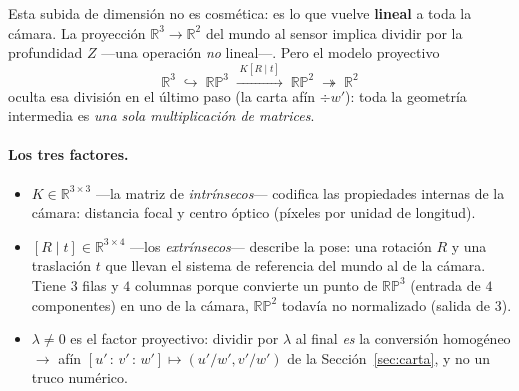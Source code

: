 \documentclass[11pt,a4paper]{article}
\newcommand{\RP}{\mathbb{RP}}
\newcommand{\R}{\mathbb{R}}
\newcommand{\hp}[3]{[#1\,{:}\,#2\,{:}\,#3]}
\begin{document}
Esta subida de dimensión no es cosmética: es lo que vuelve
\textbf{lineal} a toda la cámara. La proyección $\R^3\to\R^2$ del mundo
al sensor implica dividir por la profundidad $Z$ —una operación
\emph{no} lineal—. Pero el modelo proyectivo
\[
  \R^3 \;\hookrightarrow\; \RP^{3}
  \;\xrightarrow{\;K[R\mid t]\;}\; \RP^{2}
  \;\twoheadrightarrow\; \R^{2}
\]
oculta esa división en el último paso (la carta afín $\div w'$): toda
la geometría intermedia es \emph{una sola multiplicación de matrices}.

\paragraph{Los tres factores.}
\begin{itemize}[leftmargin=1.2em,itemsep=2pt]
\item $K\in\R^{3\times 3}$ —la matriz de \emph{intrínsecos}— codifica las
  propiedades internas de la cámara: distancia focal y centro óptico
  (píxeles por unidad de longitud).
\item $[R\mid t]\in\R^{3\times 4}$ —los \emph{extrínsecos}— describe la
  pose: una rotación $R$ y una traslación $t$ que llevan el sistema de
  referencia del mundo al de la cámara. Tiene $3$ filas y $4$ columnas
  porque convierte un punto de $\RP^3$ (entrada de $4$ componentes) en
  uno de la cámara, $\RP^2$ todavía no normalizado (salida de $3$).
\item $\lambda\neq0$ es el factor proyectivo: dividir por $\lambda$ al
  final \emph{es} la conversión homogéneo $\to$ afín
  $\hp{u'}{v'}{w'}\mapsto(u'/w',v'/w')$ de la
  Sección~\ref{sec:carta}, y no un truco numérico.
\end{itemize}
\end{document}
